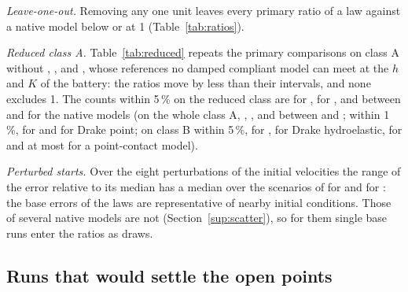 \emph{Leave-one-out.} Removing any one unit leaves every primary ratio of a law against a
native model below or at 1 (Table~\ref{tab:ratios}).

\emph{Reduced class A.} Table~\ref{tab:reduced} repeats the primary comparisons on class A
without , ,  and , whose references no damped
compliant model can meet at the $h$ and $K$ of the battery: the ratios move by less than their
intervals, and none excludes 1. The counts within 5\,\% on the reduced class are
 for ,  for
, and between  and  for the
native models (on the whole class A, ,
, and between  and
; within 1\,\%,  for 
and  for Drake point; on class B within 5\,\%,
 for ,  for Drake
hydroelastic,  for  and at most
 for a point-contact model).

\emph{Perturbed starts.} Over the eight perturbations of the initial velocities the range of
the error relative to its median has a median over the scenarios of  for
 and  for : the base errors of the laws
are representative of nearby initial conditions. Those of several native models are not
(Section~\ref{sup:scatter}), so for them single base runs enter the ratios as draws.

\begin{table}[!htbp]
\caption{Uncapped estimate: ratio of the raw errors of two methods on the same scenarios, base
variant: geometric mean, 95\,\% bootstrap interval, and scenarios won and lost by the first
method (in brackets, the scenarios left out because one of the two did not finish). Bold: the
unadjusted interval excludes 1}
\label{tab:ratios-first}
\end{table}

\begin{table}[!htbp]
\caption{The primary comparisons on class A and on class A without the four parameter-bound
scenarios}
\label{tab:reduced}
\end{table}

\subsection{Runs that would settle the open points}

